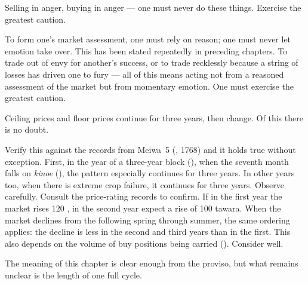 \begin{sokyubox}
{\small\itshape\color{sokyubar} }

\medskip
Selling in anger, buying in anger --- one must never do these things.
Exercise the greatest caution.
\end{sokyubox}

\commentary
To form one's market assessment, one must rely on reason; one must
never let emotion take over. This has been stated repeatedly in
preceding chapters. To trade out of envy for another's success, or
to trade recklessly because a string of losses has driven one to
fury --- all of this means acting not from a reasoned assessment of
the market but from momentary emotion. One must exercise the greatest
caution.


\begin{sokyubox}
{\small\itshape\color{sokyubar} }

\medskip
Ceiling prices and floor prices continue for three years, then change.
Of this there is no doubt.

\begin{sloppypar}
Verify this against the records from Meiwa~5 (, 1768) and it
holds true without exception. First, in the year of a three-year
block (), when the seventh month falls on
\textit{kinoe} (), the pattern especially continues for three years. In
other years too, when there is extreme crop failure, it continues for
three years. Observe carefully. Consult the price-rating records to
confirm. If in the first year the market rises 120 ,
in the second year expect a rise of 100 tawara. When
the market declines from the following spring through summer, the
same ordering applies: the decline is less in the second and third
years than in the first. This also depends on the volume of buy
positions being carried (). Consider well.
\end{sloppypar}
\end{sokyubox}

\commentary
The meaning of this chapter is clear enough from the proviso, but
what remains unclear is the length of one full cycle.

